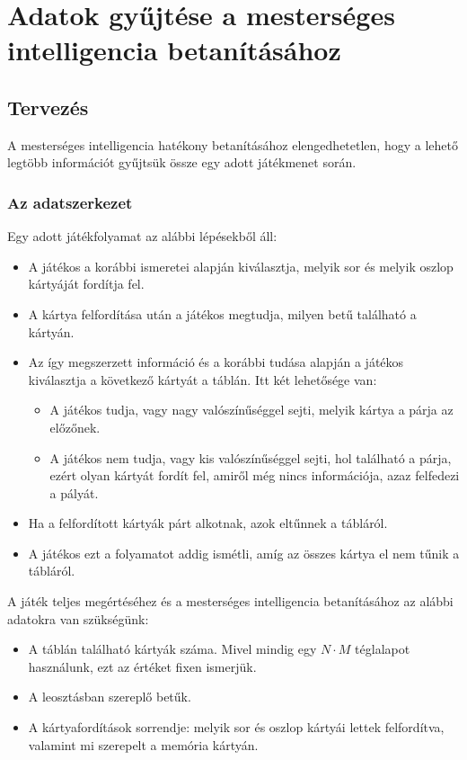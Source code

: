 \chapter{Adatok gyűjtése a mesterséges intelligencia betanításához}
\thispagestyle{fancy}
\pagestyle{fancy}

\section{Tervezés}
A mesterséges intelligencia hatékony betanításához elengedhetetlen, hogy a lehető legtöbb információt gyűjtsük össze egy adott játékmenet során.

\subsection{Az adatszerkezet}
Egy adott játékfolyamat az alábbi lépésekből áll:

\begin{itemize}
\item A játékos a korábbi ismeretei alapján kiválasztja, melyik sor és melyik oszlop kártyáját fordítja fel.
\item A kártya felfordítása után a játékos megtudja, milyen betű található a kártyán.
\item Az így megszerzett információ és a korábbi tudása alapján a játékos kiválasztja a következő kártyát a táblán. Itt két lehetősége van:
\begin{itemize}
\item A játékos tudja, vagy nagy valószínűséggel sejti, melyik kártya a párja az előzőnek.
\item A játékos nem tudja, vagy kis valószínűséggel sejti, hol található a párja, ezért olyan kártyát fordít fel, amiről még nincs információja, azaz felfedezi a pályát.
\end{itemize}
\item Ha a felfordított kártyák párt alkotnak, azok eltűnnek a tábláról.
\item A játékos ezt a folyamatot addig ismétli, amíg az összes kártya el nem tűnik a tábláról.
\end{itemize}

A játék teljes megértéséhez és a mesterséges intelligencia betanításához az alábbi adatokra van szükségünk:

\begin{itemize}
\item A táblán található kártyák száma. Mivel mindig egy $N \cdot M$ téglalapot használunk, ezt az értéket fixen ismerjük.
\item A leosztásban szereplő betűk.
\item A kártyafordítások sorrendje: melyik sor és oszlop kártyái lettek felfordítva, valamint mi szerepelt a memória kártyán.
\end{itemize}

